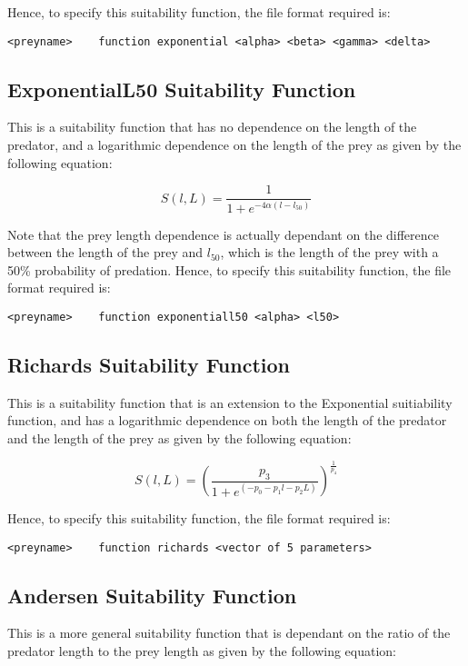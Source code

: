\documentclass[10pt,twoside]{book}
\begin{document}
Hence, to specify this suitability function, the file format required is:

{\small\begin{verbatim}
<preyname>    function exponential <alpha> <beta> <gamma> <delta>
\end{verbatim}}

\subsection{ExponentialL50 Suitability Function}
This is a suitability function that has no dependence on the length of the predator, and a logarithmic dependence on the length of the prey as given by the following equation:

\begin{equation}\label{eq:l50suit}
S(l, L) = { \frac{1}{1 + e^{ -4 \alpha (l - l_{50})}}}
\end{equation}

Note that the prey length dependence is actually dependant on the difference between the length of the prey and $l_{50}$, which is the length of the prey with a 50\% probability of predation.  Hence, to specify this suitability function, the file format required is:

{\small\begin{verbatim}
<preyname>    function exponentiall50 <alpha> <l50>
\end{verbatim}}

\subsection{Richards Suitability Function}
This is a suitability function that is an extension to the Exponential suitiability function, and has a logarithmic dependence on both the length of the predator and the length of the prey as given by the following equation:

\begin{equation}\label{eq:richsuit}
S(l, L) = \left({\frac{p_3}{1 + e^{(- p_0 - p_1 l - p_2  L)}}}\right) ^ {\frac{1}{p_4}}
\end{equation}

Hence, to specify this suitability function, the file format required is:

{\small\begin{verbatim}
<preyname>    function richards <vector of 5 parameters>
\end{verbatim}}

\subsection{Andersen Suitability Function}
This is a more general suitability function that is dependant on the ratio of the predator length to the prey length as given by the following equation:
\end{document}
